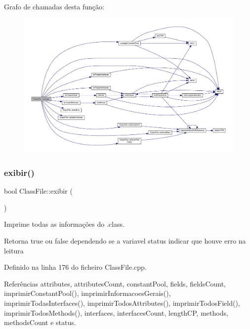 Grafo de chamadas desta função\+:
\nopagebreak
\begin{figure}[H]
\begin{center}
\leavevmode
\includegraphics[width=350pt]{classClassFile_a619e102ada15202ab84981d43362a3e9_cgraph}
\end{center}
\end{figure}
\mbox{\label{classClassFile_a7da7cc6de8de3fc6f27faf3b76f4883a}} 
\subsubsection{\texorpdfstring{exibir()}{exibir()}}
{\footnotesize\ttfamily bool Class\+File\+::exibir (\begin{DoxyParamCaption}{ }\end{DoxyParamCaption})}



Imprime todas as informações do .class. 

\begin{DoxyReturn}{Retorna}
true ou false dependendo se a variavel status indicar que houve erro na leitura 
\end{DoxyReturn}


Definido na linha 176 do ficheiro Class\+File.\+cpp.



Referências attributes, attributes\+Count, constant\+Pool, fields, fields\+Count, imprimir\+Constant\+Pool(), imprimir\+Informacoes\+Gerais(), imprimir\+Todas\+Interfaces(), imprimir\+Todos\+Attributes(), imprimir\+Todos\+Field(), imprimir\+Todos\+Methods(), interfaces, interfaces\+Count, length\+CP, methods, methods\+Count e status.



